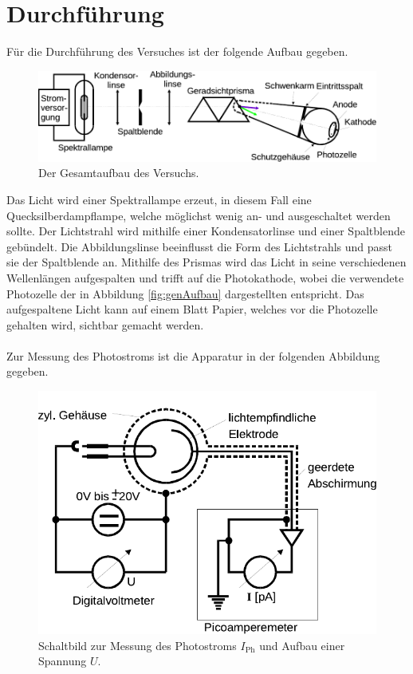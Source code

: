 \section{Durchführung}

    Für die Durchführung des Versuches ist der folgende Aufbau gegeben.

    \begin{figure}
        \centering
        \includegraphics[width=\textwidth]{content/img/Abb_3.pdf}
        \caption{Der Gesamtaufbau des Versuchs.}
        \label{fig:gesamtaufbau}
    \end{figure}

    Das Licht wird einer Spektrallampe erzeut,
    in diesem Fall eine Quecksilberdampflampe,
    welche möglichst wenig an- und ausgeschaltet werden sollte.
    Der Lichtstrahl wird mithilfe einer Kondensatorlinse und einer Spaltblende gebündelt.
    Die Abbildungslinse beeinflusst die Form des Lichtstrahls und passt sie der Spaltblende an.
    Mithilfe des Prismas wird das Licht in seine verschiedenen Wellenlängen aufgespalten und trifft auf die Photokathode,
    wobei die verwendete Photozelle der in Abbildung \ref{fig:genAufbau} dargestellten entspricht.
    Das aufgespaltene Licht kann auf einem Blatt Papier,
    welches vor die Photozelle gehalten wird,
    sichtbar gemacht werden.\\
    \\
    Zur Messung des Photostroms ist die Apparatur in der folgenden Abbildung gegeben.

    \begin{figure}
        \centering
        \includegraphics[width=\textwidth]{content/img/Abb_4.pdf}
        \caption{Schaltbild zur Messung des Photostroms $I_\text{Ph}$ und Aufbau einer Spannung $U$.}
        \label{fig:schaltbild}
    \end{figure}
    \clearpage

